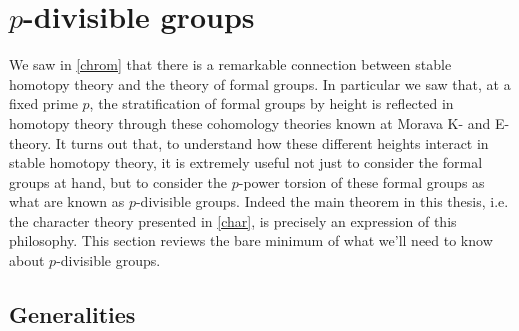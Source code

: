 \section{$p$-divisible groups}
\label{pdiv}

We saw in \cref{chrom} that there is a remarkable connection between
stable homotopy theory and the theory of formal groups. In particular
we saw that, at a fixed prime $p$, the stratification of formal groups
by height is reflected in homotopy theory through these cohomology
theories known at Morava K- and E-theory. It turns out that, to
understand how these different heights interact in stable homotopy
theory, it is extremely useful not just to consider the formal groups
at hand, but to consider the $p$-power torsion of these formal groups
as what are known as $p$-divisible groups. Indeed the main theorem in
this thesis, i.e. the character theory presented in \cref{char}, is
precisely an expression of this philosophy. This section reviews the
bare minimum of what we'll need to know about $p$-divisible groups.


\subsection{Generalities}
\label{pdiv-gen}

